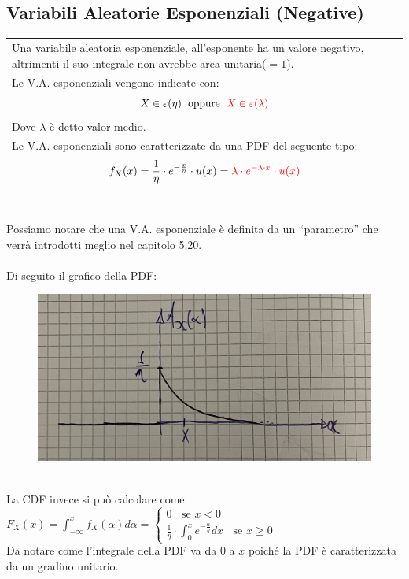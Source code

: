 \documentclass{article}
\begin{document}
\subsection{Variabili Aleatorie Esponenziali (Negative)}
\begin{tabular}{|p{13cm}}
Una variabile aleatoria esponenziale, all’esponente ha un valore negativo, altrimenti il suo integrale non avrebbe area unitaria($=1$). \\
Le V.A. esponenziali vengono indicate con:
\[X \in \varepsilon(\eta) \;\text{ oppure }\; \color{red} X \in \varepsilon(\lambda)\]
Dove $\lambda$ è detto valor medio. \\
Le V.A. esponenziali sono caratterizzate da una PDF del seguente tipo:
\[f_X(x) = \frac 1 \eta \cdot e^{- \frac x \eta} \cdot u(x) = \color{red} \lambda \cdot e^{-\lambda \cdot x} \cdot u(x)\]
\end{tabular} \\
Possiamo notare che una V.A. esponenziale è definita da un “parametro” che verrà introdotti meglio nel capitolo 5.20. \\ \\
Di seguito il grafico della PDF:
\begin{figure}[ht]
\centering
\includegraphics[scale=0.12]{images/35.PDF_VA_exp.jpeg}
\end{figure} ~\\
La CDF invece si può calcolare come: \\
$F_X(x) = \int_{- \infty}^{x} f_X(\alpha) d\alpha = 
\begin{cases}
0 \;\;\text{ se } x<0 \\
\frac 1 \eta \cdot \int_{0}^{x}e^{- \frac \alpha \eta} dx \;\;\text{ se } x \geq 0
\end{cases}$ \\
Da notare come l’integrale della PDF va da $0$ a $x$ poiché la PDF è caratterizzata da un gradino unitario. \\
\end{document}
